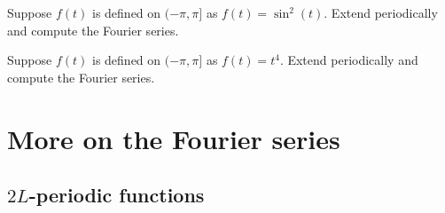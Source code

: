 \begin{exercise}
Suppose $f(t)$ is defined on $(-\pi,\pi]$ as $f(t) = \sin^2(t)$.
Extend
periodically and compute the Fourier series.
\end{exercise}

\begin{exercise}
Suppose $f(t)$ is defined on $(-\pi,\pi]$ as $f(t) = t^4$.
Extend periodically and compute the Fourier series.
\end{exercise}


\sectionnewpage
\section{More on the Fourier series}
\label{moreonfourier:section}



\subsection{$2L$-periodic functions}

